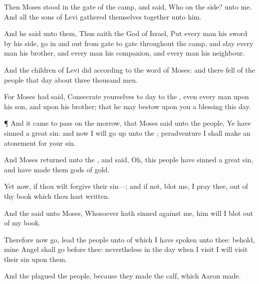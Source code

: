 {Then
Moses
stood in the
gate of the
camp, and
said, Who
{} on the
{} side?
{} unto me. And all the
sons of
Levi
gathered themselves together unto him.

And he
said unto them, Thus
saith the
{}
God of
Israel,
Put every
man his
sword by his
side,
{}
go in and
out from
gate to
gate throughout the
camp, and
slay every
man his
brother, and every
man his
companion, and every
man his
neighbour.

And the
children of
Levi
did according to the
word of
Moses: and there
fell of the
people that
day about
three
thousand
men.

For
Moses had
said, Consecrate
yourselves to
day to the
{},
even every
man upon his
son, and upon his
brother; that he may
bestow upon you a
blessing this
day.


\par }{\PP {}¶ And it came to pass on the
morrow, that
Moses
said unto the
people, Ye have
sinned a
great
sin: and now I will go
up unto the
{};
peradventure I shall make an
atonement
for your
sin.

And
Moses
returned unto the
{}, and
said,
Oh, this
people have
sinned a
great
sin, and have
made them
gods of
gold.

Yet now, if thou wilt
forgive their
sin—; and if not,
blot me, I pray thee, out of thy
book which thou hast
written.

And the
{}
said unto
Moses,
Whosoever hath
sinned against me, him will I blot
out of my
book.

Therefore now
go,
lead the
people unto
{} of which I have
spoken unto thee: behold, mine
Angel shall
go
before thee: nevertheless in the
day when I
visit I will
visit their
sin upon them.

And the
{}
plagued the
people,
because they
made the
calf,
which
Aaron
made.




\par }
